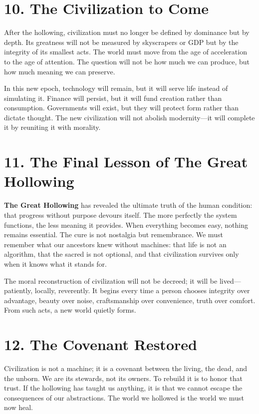 \documentclass[11pt,twoside]{book}
\begin{document}
\section*{10. The Civilization to Come}

After the hollowing, civilization must no longer be defined by dominance but by depth.  
Its greatness will not be measured by skyscrapers or GDP but by the integrity of its smallest acts.  
The world must move from the age of acceleration to the age of attention.  
The question will not be how much we can produce, but how much meaning we can preserve.

In this new epoch, technology will remain, but it will serve life instead of simulating it.  
Finance will persist, but it will fund creation rather than consumption.  
Governments will exist, but they will protect form rather than dictate thought.  
The new civilization will not abolish modernity—it will complete it by reuniting it with morality.

\section*{11. The Final Lesson of The Great Hollowing}

\textbf{The Great Hollowing} has revealed the ultimate truth of the human condition: that progress without purpose devours itself.  
The more perfectly the system functions, the less meaning it provides.  
When everything becomes easy, nothing remains essential.  
The cure is not nostalgia but remembrance.  
We must remember what our ancestors knew without machines: that life is not an algorithm, that the sacred is not optional, and that civilization survives only when it knows what it stands for.

The moral reconstruction of civilization will not be decreed; it will be lived—patiently, locally, reverently.  
It begins every time a person chooses integrity over advantage, beauty over noise, craftsmanship over convenience, truth over comfort.  
From such acts, a new world quietly forms.

\section*{12. The Covenant Restored}

Civilization is not a machine; it is a covenant between the living, the dead, and the unborn.  
We are its stewards, not its owners.  
To rebuild it is to honor that trust.  
If the hollowing has taught us anything, it is that we cannot escape the consequences of our abstractions.  
The world we hollowed is the world we must now heal.
\end{document}
